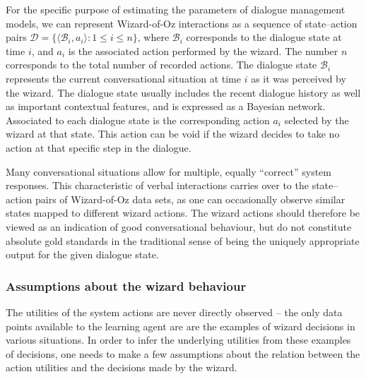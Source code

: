 For the specific purpose of estimating the parameters of dialogue management models, we can represent Wizard-of-Oz interactions as a sequence of state--action pairs $\mathcal{D} = \{\langle \mathcal{B}_i, a_i \rangle : 1 \leq i \leq n\}$, where $\mathcal{B}_i$ corresponds to the dialogue state at time $i$, and $a_i$ is the associated action performed by the wizard.  The number $n$ corresponds to the total number of recorded actions. 
The dialogue state $\mathcal{B}_i$ represents the current conversational situation at time $i$ as it was perceived by the wizard.  The dialogue state usually includes the recent dialogue history as well as important contextual features, and is expressed as a Bayesian network. Associated to each dialogue state is the corresponding action $a_i$ selected by the wizard at that state. This action can be void if the wizard decides to take no action at that specific step in the dialogue. 



Many conversational situations allow for multiple, equally ``correct'' system responses.  This characteristic of verbal interactions carries over to the state--action pairs of Wizard-of-Oz data sets, as one can occasionally observe similar states mapped to different wizard actions. The wizard actions should therefore be viewed as an indication of good conversational behaviour, but do not constitute absolute gold standards in the traditional sense of being the uniquely appropriate output for the given dialogue state. 


\subsubsection*{Assumptions about the wizard behaviour}

The utilities of the system actions are never directly observed -- the only data points available to the learning agent are are the examples of wizard decisions in various situations.  In order to infer the underlying utilities from these examples of decisions, one needs to make a few assumptions about the relation between the action utilities and the decisions made by the wizard. 

